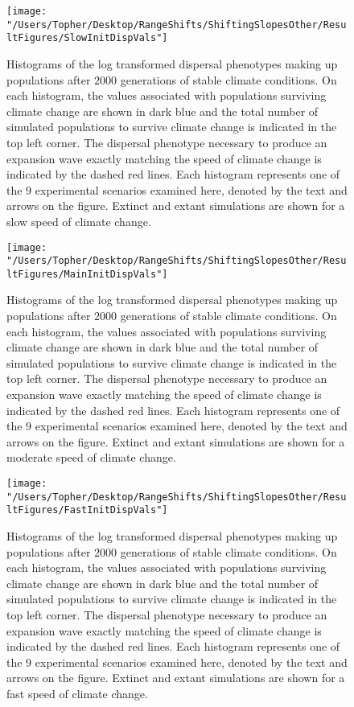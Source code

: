 \documentclass[12pt, oneside]{article}
\begin{document}
\begin{figure}
\centering
\texttt{[image: "/Users/Topher/Desktop/RangeShifts/ShiftingSlopesOther/ResultFigures/SlowInitDispVals"]}
\vspace{-5mm}
\caption[LoF entry]{Histograms of the log transformed dispersal phenotypes making up populations after $2000$ generations of stable climate conditions. On each histogram, the values associated with populations surviving climate change are shown in dark blue and the total number of simulated populations to survive climate change is indicated in the top left corner. The dispersal phenotype necessary to produce an expansion wave exactly matching the speed of climate change is indicated by the dashed red lines. Each histogram represents one of the $9$ experimental scenarios examined here, denoted by the text and arrows on the figure. Extinct and extant simulations are shown for a slow speed of climate change.}
\label{fig:InitDispSlow}
\end{figure}

\begin{figure}
\centering
\texttt{[image: "/Users/Topher/Desktop/RangeShifts/ShiftingSlopesOther/ResultFigures/MainInitDispVals"]}
\vspace{-5mm}
\caption[LoF entry]{Histograms of the log transformed dispersal phenotypes making up populations after $2000$ generations of stable climate conditions. On each histogram, the values associated with populations surviving climate change are shown in dark blue and the total number of simulated populations to survive climate change is indicated in the top left corner. The dispersal phenotype necessary to produce an expansion wave exactly matching the speed of climate change is indicated by the dashed red lines. Each histogram represents one of the $9$ experimental scenarios examined here, denoted by the text and arrows on the figure. Extinct and extant simulations are shown for a moderate speed of climate change.}
\label{fig:InitDispMain}
\end{figure}

\begin{figure}
\centering
\texttt{[image: "/Users/Topher/Desktop/RangeShifts/ShiftingSlopesOther/ResultFigures/FastInitDispVals"]}
\vspace{-5mm}
\caption[LoF entry]{Histograms of the log transformed dispersal phenotypes making up populations after $2000$ generations of stable climate conditions. On each histogram, the values associated with populations surviving climate change are shown in dark blue and the total number of simulated populations to survive climate change is indicated in the top left corner. The dispersal phenotype necessary to produce an expansion wave exactly matching the speed of climate change is indicated by the dashed red lines. Each histogram represents one of the $9$ experimental scenarios examined here, denoted by the text and arrows on the figure. Extinct and extant simulations are shown for a fast speed of climate change.}
\label{fig:InitDispFast}
\end{figure}
\end{document}

